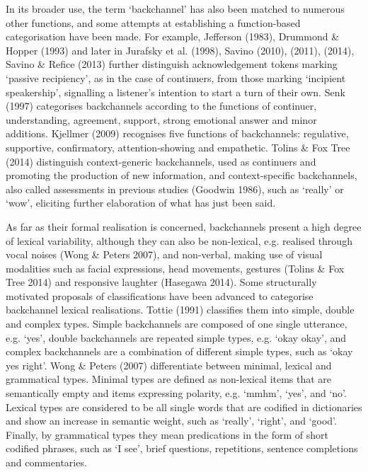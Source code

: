 \begin{styleStandard}
In its broader use, the term ‘backchannel’ has also been matched to numerous other functions, and some attempts at establishing a function-based categorisation have been made. For example, Jefferson (1983), Drummond \& Hopper (1993) and later in Jurafsky et al. (1998), Savino (2010), (2011), (2014), Savino \& Refice (2013) further distinguish acknowledgement tokens marking ‘passive recipiency’, as in the case of continuers, from those marking ‘incipient speakership’, signalling a listener’s intention to start a turn of their own. Senk (1997) categorises backchannels according to the functions of continuer, understanding, agreement, support, strong emotional answer and minor additions. Kjellmer (2009) recognises five functions of backchannels: regulative, supportive, confirmatory, attention-showing and empathetic. Tolins \& Fox Tree (2014) distinguish context-generic backchannels, used as continuers and promoting the production of new information, and context-specific backchannels, also called assessments in previous studies (Goodwin 1986), such as ‘really’ or ‘wow’, eliciting further elaboration of what has just been said.
\end{styleStandard}

\begin{styleStandard}
As far as their formal realisation is concerned, backchannels present a high degree of lexical variability, although they can also be non-lexical, e.g. realised through vocal noises (Wong \& Peters 2007), and non-verbal, making use of visual modalities such as facial expressions, head movements, gestures (Tolins \& Fox Tree 2014) and responsive laughter (Hasegawa 2014). Some structurally motivated proposals of classifications have been advanced to categorise backchannel lexical realisations. Tottie (1991) classifies them into simple, double and complex types. Simple backchannels are composed of one single utterance, e.g. ‘yes’, double backchannels are repeated simple types, e.g. ‘okay okay’, and complex backchannels are a combination of different simple types, such as ‘okay yes right’. Wong \& Peters (2007) differentiate between minimal, lexical and grammatical types. Minimal types are defined as non-lexical items that are semantically empty and items expressing polarity, e.g. ‘mmhm’, ‘yes’, and ‘no’. Lexical types are considered to be all single words that are codified in dictionaries and show an increase in semantic weight, such as ‘really’, ‘right’, and ‘good’. Finally, by grammatical types they mean predications in the form of short codified phrases, such as ‘I see’, brief questions, repetitions, sentence completions and commentaries.
\end{styleStandard}


